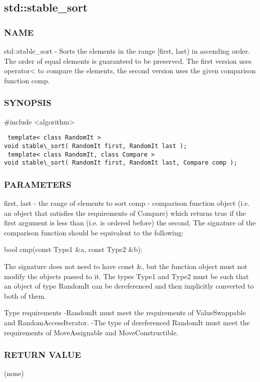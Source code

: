 \subsection{std::stable\_sort}

\subsubsection{NAME}
std::stable\_sort - Sorts the elements in the range [first, last) in ascending order. The order of equal elements is guaranteed to be preserved. The first version uses operator< to compare the elements, the second version uses the given comparison function comp.

\subsubsection{SYNOPSIS}
\#include <algorithm>

\begin{lstlisting}
 template< class RandomIt >
void stable\_sort( RandomIt first, RandomIt last );
 template< class RandomIt, class Compare >
void stable\_sort( RandomIt first, RandomIt last, Compare comp );
\end{lstlisting}

\subsubsection{PARAMETERS}
first, last - the range of elements to sort
comp - comparison function object (i.e. an object that satisfies the requirements of Compare) which returns true if the first argument is less than (i.e. is ordered before) the second.
The signature of the comparison function should be equivalent to the following:

 bool cmp(const Type1 \&a, const Type2 \&b);

The signature does not need to have const \&, but the function object must not modify the objects passed to it.
The types Type1 and Type2 must be such that an object of type RandomIt can be dereferenced and then implicitly converted to both of them.

 Type requirements
 -RandomIt must meet the requirements of ValueSwappable and RandomAccessIterator.
 -The type of dereferenced RandomIt must meet the requirements of MoveAssignable and MoveConstructible.

\subsubsection{RETURN VALUE}
(none)



